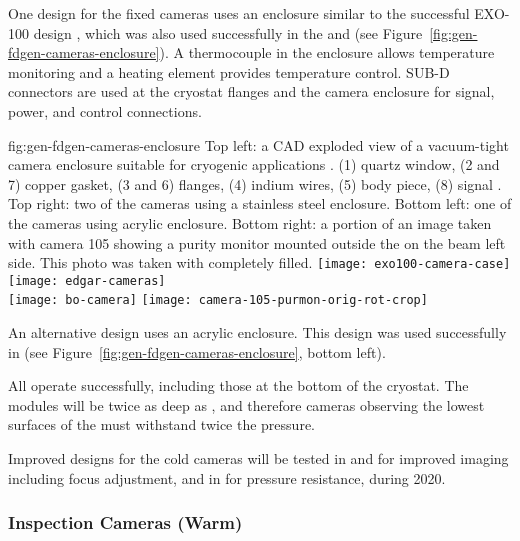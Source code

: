 One design for the  fixed cameras uses an enclosure similar to
the successful EXO-100 design \cite{Delaquis:2013hva}, which was also
used successfully in the   
and  (see Figure~\ref{fig:gen-fdgen-cameras-enclosure}).
A thermocouple in the enclosure allows temperature monitoring and a heating element provides temperature control.  
SUB-D 
connectors are used at the cryostat flanges and the camera enclosure for signal, power, and control connections.


\begin{dunefigure}{fig:gen-fdgen-cameras-enclosure}
  {Top left: a CAD exploded view of a vacuum-tight camera enclosure suitable for cryogenic applications \cite{Delaquis:2013hva}.
    (1) quartz window, (2 and 7) copper gasket, (3 and 6) flanges, (4) indium wires, (5) body piece, (8) signal \fdth.
    Top right: two of the  cameras using a stainless steel enclosure. 
    Bottom left: one of the  cameras using acrylic enclosure.
    Bottom right: a portion of an image taken with  camera 105 showing a purity monitor mounted outside the  on the beam left side. This photo was taken with  completely filled.
  }
  \texttt{[image: exo100-camera-case]}%
  \texttt{[image: edgar-cameras]}\\
  \hfill \texttt{[image: bo-camera]}%
  \hfill \texttt{[image: camera-105-purmon-orig-rot-crop]}%
  \hfill
\end{dunefigure}

An alternative design uses an acrylic enclosure.
This design was used successfully in  (see Figure~\ref{fig:gen-fdgen-cameras-enclosure}, bottom left).

All operate successfully, including those at the bottom of the cryostat.  %
The  modules will be twice as deep as , and therefore cameras observing the lowest surfaces of the  must withstand twice the pressure.

Improved designs for the cold cameras will be tested in  and  for improved imaging including focus adjustment, and in  for pressure resistance, during 2020. 

\subsubsection{Inspection Cameras (Warm)}

